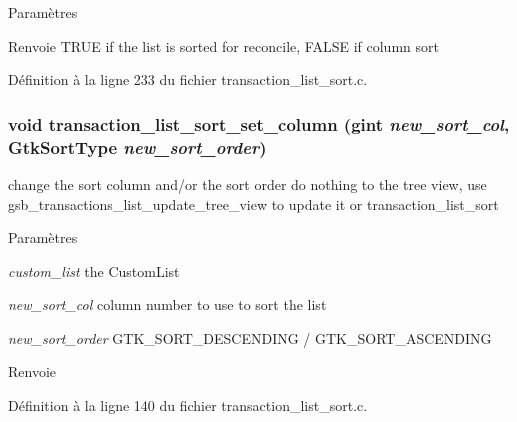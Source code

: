 \begin{DoxyParams}{Paramètres}
\item[{\em }]\end{DoxyParams}
\begin{DoxyReturn}{Renvoie}
TRUE if the list is sorted for reconcile, FALSE if column sort 
\end{DoxyReturn}


Définition à la ligne 233 du fichier transaction\_\-list\_\-sort.c.

\subsubsection[{transaction\_\-list\_\-sort\_\-set\_\-column}]{\setlength{\rightskip}{0pt plus 5cm}void transaction\_\-list\_\-sort\_\-set\_\-column (gint {\em new\_\-sort\_\-col}, \/  GtkSortType {\em new\_\-sort\_\-order})}\label{transaction__list__sort_8h_ad124c81fa4121869ac23b1e67a96a9d2}
change the sort column and/or the sort order do nothing to the tree view, use gsb\_\-transactions\_\-list\_\-update\_\-tree\_\-view to update it or transaction\_\-list\_\-sort


\begin{DoxyParams}{Paramètres}
\item[{\em custom\_\-list}]the CustomList \item[{\em new\_\-sort\_\-col}]column number to use to sort the list \item[{\em new\_\-sort\_\-order}]GTK\_\-SORT\_\-DESCENDING / GTK\_\-SORT\_\-ASCENDING\end{DoxyParams}
\begin{DoxyReturn}{Renvoie}

\end{DoxyReturn}


Définition à la ligne 140 du fichier transaction\_\-list\_\-sort.c.


